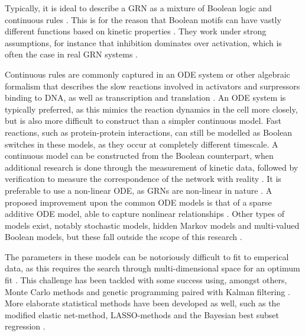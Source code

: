 \documentclass[../main.tex]{subfiles}
\begin{document}
Typically, it is ideal to describe a GRN as a mixture of Boolean logic and continuous rules \cite{bolouri2002modeling}.
This is for the reason that Boolean motifs can have vastly different functions based on kinetic properties \cite{ingram2006network}.
They work under strong assumptions, for instance that inhibition dominates over activation, which is often the case in real GRN systems \cite{wang2010process, he2016algorithm}. %

Continuous rules are commonly captured in an ODE system or other algebraic formalism that describes the slow reactions involved in activators and surpressors binding to DNA, as well as transcription and translation \cite{ingram2006network}.
An ODE system is typically preferred, as this mimics the reaction dynamics in the cell more closely, but is also more difficult to construct than a simpler continuous model.
Fast reactions, such as protein-protein interactions, can still be modelled as Boolean switches in these models, as they occur at completely different timescale.
A continuous model can be constructed  from the Boolean counterpart, when additional research is done through the measurement of kinetic data, followed by verification to measure the correspondence of the network with reality \cite{bolouri2002modeling}.
It is preferable to use a non-linear ODE, as GRNs are non-linear in nature \cite{qian2008inference, tyson2003sniffers}.
A proposed improvement upon the common ODE models is that of a sparse additive ODE model, able to capture nonlinear relationships \cite{wu2014sparse}.
Other types of models exist, notably stochastic models, hidden Markov models and multi-valued Boolean models, but these fall outside the scope of this research \cite{bolouri2002modeling, wu2014sparse}.

The parameters in these models can be notoriously difficult to fit to emperical data, as this requires the search through multi-dimensional space for an optimum fit \cite{bolouri2002modeling, kuhn2009monte}.
This challenge has been tackled with some success using, amongst others, Monte Carlo methods and genetic programming paired with Kalman filtering \cite{qian2008inference, kuhn2009monte}.
More elaborate statistical methods have been developed as well, such as the modified elastic net-method, LASSO-methods and the Bayesian best subset regression \cite{greenfield2013robust, wu2014sparse}.
\end{document}
